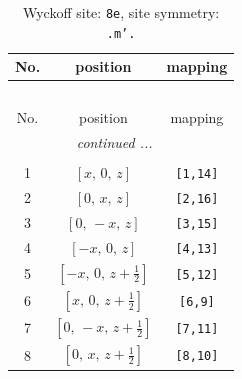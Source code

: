 \documentclass[fleqn,8pt]{jsarticle}
\begin{document}
\renewcommand{\arraystretch}{1.2}
\begin{longtable}{ccc}
\caption{Wyckoff site: {\tt 8e}, site symmetry: {\tt .m'.}}
 \\
 \hline \hline
No. & position & mapping \\ \hline \endfirsthead

\multicolumn{2}{l}{\tablename\ \thetable{}} \\
 \hline \hline
No. & position & mapping \\ \hline \endhead

 \hline \hline
\multicolumn{2}{r}{\footnotesize\it continued ...} \\ \endfoot

 \hline \hline
\multicolumn{2}{r}{} \\ \endlastfoot

1 & $\left[ x,\, 0,\, z \right]$ & {\tt [1,14]} \\ \hline
2 & $\left[ 0,\, x,\, z \right]$ & {\tt [2,16]} \\ \hline
3 & $\left[ 0,\, - x,\, z \right]$ & {\tt [3,15]} \\ \hline
4 & $\left[ - x,\, 0,\, z \right]$ & {\tt [4,13]} \\ \hline
5 & $\left[ - x,\, 0,\, z + \frac{1}{2} \right]$ & {\tt [5,12]} \\ \hline
6 & $\left[ x,\, 0,\, z + \frac{1}{2} \right]$ & {\tt [6,9]} \\ \hline
7 & $\left[ 0,\, - x,\, z + \frac{1}{2} \right]$ & {\tt [7,11]} \\ \hline
8 & $\left[ 0,\, x,\, z + \frac{1}{2} \right]$ & {\tt [8,10]} \\
\end{longtable}
\renewcommand{\arraystretch}{1.2}
\end{document}
